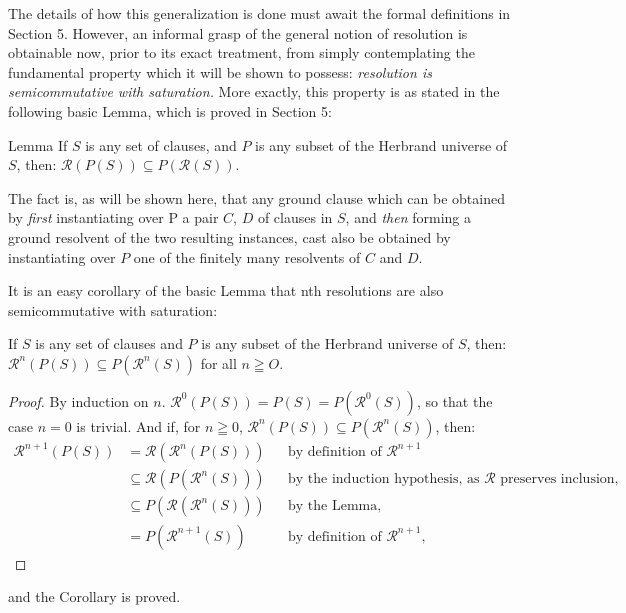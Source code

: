 \documentclass[8pt]{extarticle}
\begin{document}
The details of how this generalization is done must await the formal definitions in Section 5. However, an informal grasp of the general notion of resolution is obtainable now, prior to its exact treatment, from simply contemplating the fundamental property which it will be shown to possess: \emph{resolution is semicommutative with saturation.} More exactly, this property is as stated in the following basic Lemma, which is proved in Section 5:

\begin{p7lemma}{Lemma}\label{p7lemma}
If $S$ is any set of clauses, and $P$ is any subset of the Herbrand universe of $S$, then: $\mathcal{R}(P(S)) \subseteq P(\mathcal{R}(S))$.
\end{p7lemma}

The fact is, as will be shown here, that any ground clause which can be obtained by \emph{first} instantiating over P a pair $C$, $D$ of clauses in $S$, and \emph{then} forming a ground resolvent of the two resulting instances, cast also be obtained by instantiating over $P$ one of the finitely many resolvents of $C$ and $D$.

It is an easy corollary of the basic Lemma that nth resolutions are also semicommutative with saturation: 

\begin{p7corollary}{}\label{p7corollary}
If $S$ is any set of clauses and $P$ is any subset of the Herbrand
universe of $S$, then: $\mathcal{R}^n(P(S)) \subseteq P(\mathcal{R}^n(S))$ for all $n \geqq O$.
\end{p7corollary}

\begin{proof}
    By induction on $n$. $\mathcal{R}^0(P(S)) = P(S) = P(\mathcal{R}^0(S))$, so that the case $n = 0$ is trivial. And if, for $n \geqq 0$, $\mathcal{R}^n(P(S)) \subseteq P(\mathcal{R}^n(S))$, then:
    \begin{align*}
        \mathcal{R}^{n+1}(P(S)) &= \mathcal{R}(\mathcal{R}^n(P(S))) && \text{by definition of $\mathcal{R}^{n+1}$}\\
                                &\subseteq \mathcal{R}(P(\mathcal{R}^n(S))) && \text{by the induction hypothesis, as $\mathcal{R}$ preserves inclusion,}\\
                                &\subseteq P(\mathcal{R}(\mathcal{R}^n(S))) && \text{by the Lemma,}\\
                                &= P(\mathcal{R}^{n+1}(S)) && \text{by definition of $\mathcal{R}^{n+1}$,}
    \end{align*}
\end{proof}
\noindent and the Corollary is proved.
\end{document}
